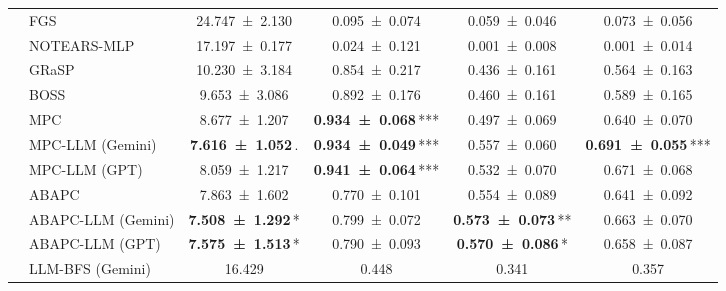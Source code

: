 \begin{table}[t]
{\begin{tabular}{l|lcccc}
     & FGS & \num{24.747 +- 2.130} & \num{0.095 +- 0.074} & \num{0.059 +- 0.046} & \num{0.073 +- 0.056} \\
     & NOTEARS-MLP & \num{17.197 +- 0.177} & \num{0.024 +- 0.121} & \num{0.001 +- 0.008} & \num{0.001 +- 0.014} \\
     & GRaSP & \num{10.230 +- 3.184} & \num{0.854 +- 0.217} & \num{0.436 +- 0.161} & \num{0.564 +- 0.163} \\
     & BOSS & \num{9.653 +- 3.086} & \num{0.892 +- 0.176} & \num{0.460 +- 0.161} & \num{0.589 +- 0.165} \\
     & MPC & \num{8.677 +- 1.207} & {\bfseries \num{0.934 +- 0.068}}\,\textnormal{***} & \num{0.497 +- 0.069} & \num{0.640 +- 0.070} \\
     & MPC-LLM (Gemini) & {\bfseries \num{7.616 +- 1.052}}\,\textnormal{.} & {\bfseries \num{0.934 +- 0.049}}\,\textnormal{***} & \num{0.557 +- 0.060} & {\bfseries \num{0.691 +- 0.055}}\,\textnormal{***} \\
     & MPC-LLM (GPT) & \num{8.059 +- 1.217} & {\bfseries \num{0.941 +- 0.064}}\,\textnormal{***} & \num{0.532 +- 0.070} & \num{0.671 +- 0.068} \\
     & ABAPC & \num{7.863 +- 1.602} & \num{0.770 +- 0.101} & \num{0.554 +- 0.089} & \num{0.641 +- 0.092} \\
     & ABAPC-LLM (Gemini) & {\bfseries \num{7.508 +- 1.292}}\,\textnormal{*} & \num{0.799 +- 0.072} & {\bfseries \num{0.573 +- 0.073}}\,\textnormal{**} & \num{0.663 +- 0.070} \\
     & ABAPC-LLM (GPT) & {\bfseries \num{7.575 +- 1.513}}\,\textnormal{*} & \num{0.790 +- 0.093} & {\bfseries \num{0.570 +- 0.086}}\,\textnormal{*} & \num{0.658 +- 0.087} \\
     & LLM-BFS (Gemini) & \num{16.429} & \num{0.448} & \num{0.341} & \num{0.357} \\
    \bottomrule
    \end{tabular}
    }
\end{table}
